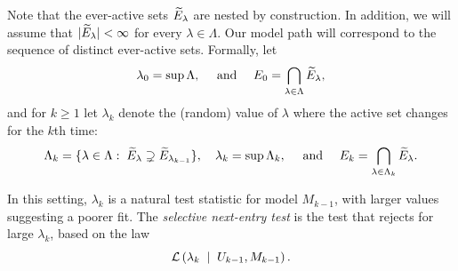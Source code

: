 \documentclass{article}
\begin{document}
Note that the ever-active sets $\widetilde{E}_\lambda$ are nested by construction. In addition, we will assume that $|\widetilde{E}_\lambda|<\infty$ for every $\lambda\in\Lambda$. Our model path will correspond to the sequence of distinct ever-active sets. 
Formally, let 
\[
\lambda_0=\sup \Lambda, \quad \text{ and } \quad 
E_0 = \bigcap_{\lambda\in \Lambda} \widetilde{E}_\lambda,
\]
and for $k\geq 1$ let $\lambda_k$ denote the (random) value of $\lambda$ where the active set changes for the $k$th time:
\begin{equation}
  \Lambda_k = \{\lambda\in \Lambda:\; \widetilde{E}_\lambda \supsetneq \widetilde{E}_{\lambda_{k-1}}\},
  \quad
  \lambda_k = \sup\Lambda_k,
  \quad \text{ and } \quad
  E_k = \bigcap_{\lambda\in\Lambda_k} \widetilde{E}_{\lambda}.
\end{equation}

In this setting, $\lambda_k$ is a natural test statistic for model $M_{k-1}$, with larger values suggesting a poorer fit. The {\em selective next-entry test} is the test that rejects for large $\lambda_k$, based on the law
\begin{equation}
\mathcal{L}\left(\lambda_k \;\mid\; U_{k-1}, M_{k-1}\right).
\end{equation}
\end{document}
